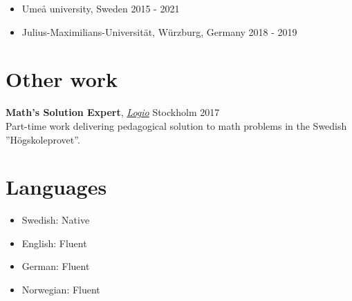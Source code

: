 \documentclass[11pt, a4paper]{article}
\begin{document}
\begin{itemize}[noitemsep]
    \item Umeå university, Sweden \hfill 2015 - 2021
    \item Julius-Maximilians-Universität, Würzburg, Germany \hfill 2018 - 2019
\end{itemize}
%

\section*{Other work}
\textbf{Math's Solution Expert}, \textit{\href{https://logio.se}{Logio}} Stockholm \hfill 2017 \\
    Part-time work delivering pedagogical solution to math problems in the Swedish
    ”Högskoleprovet”.

\section*{Languages}
\begin{itemize}[noitemsep]
    \item Swedish: Native
    \item English: Fluent
    \item German: Fluent
    \item Norwegian: Fluent
\end{itemize}
\end{document}
